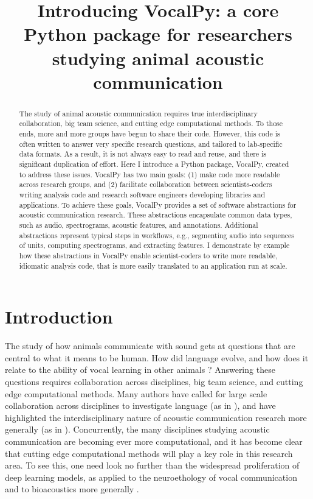 \documentclass[11pt]{article}
\title{Introducing VocalPy: a core Python package for researchers studying animal acoustic communication}
\begin{document}
%
\maketitle
\begin{abstract}
The study of animal acoustic communication requires true interdisciplinary collaboration, big team science, and cutting edge computational methods. To those ends, more and more groups have begun to share their code. However, this code is often written to answer very specific research questions, and tailored to lab-specific data formats. As a result, it is not always easy to read and reuse, and there is significant duplication of effort. Here I introduce a Python package, VocalPy, created to address these issues. VocalPy has two main goals: (1) make code more readable across research groups, and (2) facilitate collaboration between scientists-coders writing analysis code and research software engineers developing libraries and applications. To achieve these goals, VocalPy provides a set of software abstractions for acoustic communication research. These abstractions encapsulate common data types, such as audio, spectrograms, acoustic features, and annotations. Additional abstractions represent typical steps in workflows, e.g., segmenting audio into sequences of units, computing spectrograms, and extracting features. I demonstrate by example how these abstractions in VocalPy enable scientist-coders to write more readable, idiomatic analysis code, that is more easily translated to an application run at scale.
\end{abstract}

\section{Introduction}
\label{sec:introduction}

The study of how animals communicate with sound gets at questions that are central to what it means to be human. How did language evolve, and how does it relate to the ability of vocal learning in other animals  \cite{hauserFacultyLanguageWhat2002, wirthlinModularApproachVocal2019}?
Answering these questions requires collaboration across disciplines, big team science, and cutting edge computational methods.
Many authors have called for large scale collaboration across disciplines to investigate language (as in \cite{hauserFacultyLanguageWhat2002}), and have highlighted the interdisciplinary nature of acoustic communication research more generally (as in \cite{wirthlinModularApproachVocal2019}).
Concurrently, the many disciplines
studying acoustic communication are becoming ever more computational,
and it has become clear that cutting edge computational methods will play a key role in this research area.
To see this, one need look no further than the widespread proliferation of deep learning models, as applied to the neuroethology of vocal communication \cite{sainburgComputationalNeuroethologyVocal2021} and to bioacoustics more generally \cite{stowellComputationalBioacousticsDeep2022}.
\end{document}
